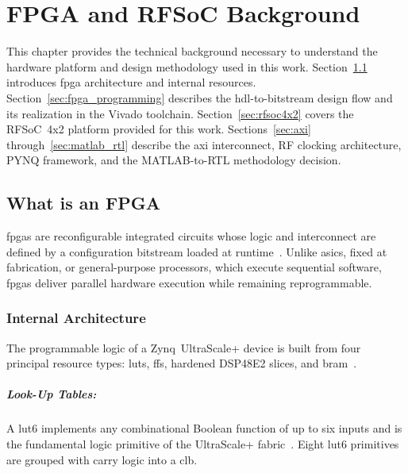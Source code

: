 \chapter{FPGA and RFSoC Background}
\label{ch:fpga_background}

This chapter provides the technical background necessary to
understand the hardware platform and design methodology used
in this work.
Section~\ref{sec:what_is_fpga} introduces \ac{fpga} architecture
and internal resources.
Section~\ref{sec:fpga_programming} describes the \ac{hdl}-to-bitstream
design flow and its realization in the Vivado toolchain.
Section~\ref{sec:rfsoc4x2} covers the RFSoC~4x2 platform provided
for this work.
Sections~\ref{sec:axi} through~\ref{sec:matlab_rtl} describe the
\ac{axi} interconnect, RF clocking architecture, PYNQ framework,
and the MATLAB-to-RTL methodology decision.



\section{What is an FPGA}
\label{sec:what_is_fpga}

\acp{fpga} are reconfigurable integrated circuits whose logic and
interconnect are defined by a configuration bitstream loaded at
runtime~\cite{Kuon2007}.
Unlike \acp{asic}, fixed at fabrication, or general-purpose processors,
which execute sequential software, \acp{fpga} deliver parallel hardware
execution while remaining reprogrammable.


\subsection{Internal Architecture}
\label{subsec:fpga_resources}

The programmable logic of a Zynq~UltraScale+ device is built from four
principal resource types: \acp{lut}, \acp{ff}, hardened DSP48E2 slices,
and \ac{bram}~\cite{AMD_UG574,AMD_UG579}.

\paragraph{Look-Up Tables:}
A \ac{lut6} implements any combinational Boolean function of up to six
inputs and is the fundamental logic primitive of the UltraScale+
fabric~\cite{AMD_UG574}.
Eight \ac{lut6} primitives are grouped with carry logic into a \ac{clb}.

